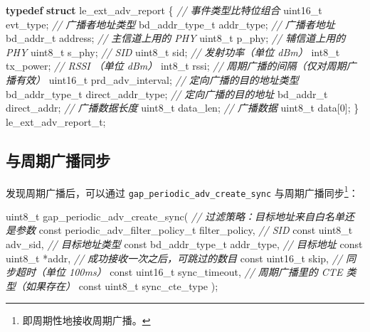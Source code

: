 \documentclass[
  12pt,
]{book}
\newenvironment{Shaded}{\begin{snugshade}}{\end{snugshade}}
\newcommand{\CommentTok}[1]{\textcolor[rgb]{0.56,0.35,0.01}{\textit{#1}}}
\newcommand{\DataTypeTok}[1]{\textcolor[rgb]{0.13,0.29,0.53}{#1}}
\newcommand{\DecValTok}[1]{\textcolor[rgb]{0.00,0.00,0.81}{#1}}
\newcommand{\KeywordTok}[1]{\textcolor[rgb]{0.13,0.29,0.53}{\textbf{#1}}}
\newcommand{\NormalTok}[1]{#1}
\begin{document}
\begin{Shaded}
\begin{Highlighting}[]
\KeywordTok{typedef} \KeywordTok{struct}\NormalTok{ le_ext_adv_report}
\NormalTok{\{}
    \CommentTok{// 事件类型比特位组合}
    \DataTypeTok{uint16_t}\NormalTok{        evt_type;}
    \CommentTok{// 广播者地址类型}
\NormalTok{    bd_addr_type_t  addr_type;}
    \CommentTok{// 广播者地址}
\NormalTok{    bd_addr_t       address;}
    \CommentTok{// 主信道上用的 PHY}
    \DataTypeTok{uint8_t}\NormalTok{         p_phy;}
    \CommentTok{// 辅信道上用的 PHY}
    \DataTypeTok{uint8_t}\NormalTok{         s_phy;}
    \CommentTok{// SID}
    \DataTypeTok{uint8_t}\NormalTok{         sid;}
    \CommentTok{// 发射功率（单位 dBm）}
     \DataTypeTok{int8_t}\NormalTok{         tx_power;}
    \CommentTok{// RSSI （单位 dBm）}
     \DataTypeTok{int8_t}\NormalTok{         rssi;}
    \CommentTok{// 周期广播的间隔（仅对周期广播有效）}
    \DataTypeTok{uint16_t}\NormalTok{        prd_adv_interval;}
    \CommentTok{// 定向广播的目的地址类型}
\NormalTok{    bd_addr_type_t  direct_addr_type;}
    \CommentTok{// 定向广播的目的地址}
\NormalTok{    bd_addr_t       direct_addr;}
    \CommentTok{// 广播数据长度}
    \DataTypeTok{uint8_t}\NormalTok{         data_len;}
    \CommentTok{// 广播数据}
    \DataTypeTok{uint8_t}\NormalTok{         data[}\DecValTok{0}\NormalTok{];}
\NormalTok{\} le_ext_adv_report_t;}
\end{Highlighting}
\end{Shaded}

\hypertarget{ux4e0eux5468ux671fux5e7fux64adux540cux6b65}{%
\subsection{与周期广播同步}\label{ux4e0eux5468ux671fux5e7fux64adux540cux6b65}}

发现周期广播后，可以通过 \texttt{gap\_periodic\_adv\_create\_sync} 与周期广播同步\footnote{即周期性地接收周期广播。}：

\begin{Shaded}
\begin{Highlighting}[]
\DataTypeTok{uint8_t}\NormalTok{ gap_periodic_adv_create_sync(}
  \CommentTok{// 过滤策略：目标地址来自白名单还是参数}
  \DataTypeTok{const}\NormalTok{ periodic_adv_filter_policy_t filter_policy,}
  \CommentTok{// SID}
  \DataTypeTok{const} \DataTypeTok{uint8_t}\NormalTok{ adv_sid,}
  \CommentTok{// 目标地址类型}
  \DataTypeTok{const}\NormalTok{ bd_addr_type_t addr_type,}
  \CommentTok{// 目标地址}
  \DataTypeTok{const} \DataTypeTok{uint8_t}\NormalTok{ *addr,}
  \CommentTok{// 成功接收一次之后，可跳过的数目}
  \DataTypeTok{const} \DataTypeTok{uint16_t}\NormalTok{ skip,}
  \CommentTok{// 同步超时（单位 100ms）}
  \DataTypeTok{const} \DataTypeTok{uint16_t}\NormalTok{ sync_timeout,}
  \CommentTok{// 周期广播里的 CTE 类型（如果存在）}
  \DataTypeTok{const} \DataTypeTok{uint8_t}\NormalTok{ sync_cte_type}
\NormalTok{);}
\end{Highlighting}
\end{Shaded}
\end{document}
